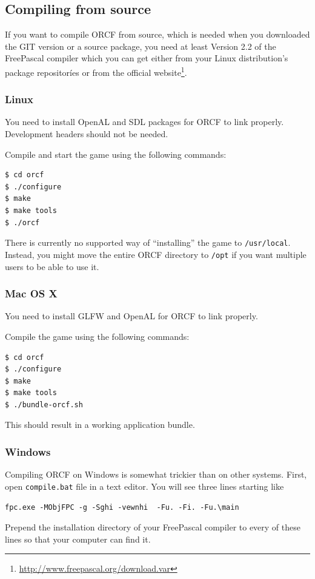 \documentclass[a4paper]{article}
\newcommand{\cfile}[1]{\texttt{#1}}
\begin{document}
\subsection{Compiling from source}
If you want to compile ORCF from source, which is needed when you downloaded the GIT version or a source package, you need at least Version
2.2 of the FreePascal compiler which you can get either from your Linux distribution's package repositoríes or from the official
website\footnote{\url{http://www.freepascal.org/download.var}}.

\subsubsection{Linux}
You need to install OpenAL and SDL packages for ORCF to link properly. Development headers should not be needed.

Compile and start the game using the following commands:
\begin{lstlisting}
$ cd orcf
$ ./configure
$ make
$ make tools
$ ./orcf
\end{lstlisting}
There is currently no supported way of ``installing'' the game to \cfile{/usr/local}. Instead, you might move the entire ORCF directory to
\texttt{/opt} if you want multiple users to be able to use it.

\subsubsection{Mac OS X}
You need to install GLFW and OpenAL for ORCF to link properly.

Compile the game using the following commands:
\begin{lstlisting}
$ cd orcf
$ ./configure
$ make
$ make tools
$ ./bundle-orcf.sh
\end{lstlisting}
This should result in a working application bundle.

\subsubsection{Windows}
Compiling ORCF on Windows is somewhat trickier than on other systems. First, open \cfile{compile.bat} file in a text editor. You will see
three lines starting like
\begin{lstlisting}
fpc.exe -MObjFPC -g -Sghi -vewnhi  -Fu. -Fi. -Fu.\main 
\end{lstlisting}
Prepend the installation directory of your FreePascal compiler to every of these lines so that your computer can find it.
\end{document}
